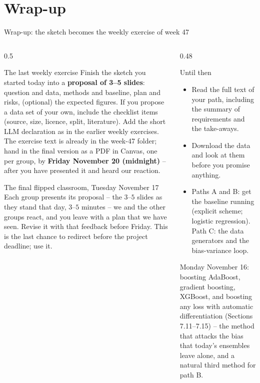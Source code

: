 \documentclass[10pt,aspectratio=169]{beamer}
\begin{document}
\section{Wrap-up}

\begin{frame}{Wrap-up: the sketch becomes the weekly exercise of week 47}
\scriptsize
\begin{columns}[T]
\begin{column}{0.5\textwidth}
\begin{block}{The last weekly exercise}
Finish the sketch you started today into a \textbf{proposal of 3--5
slides}: question and data, methods and baseline, plan and risks, (optional)
the expected figures.  If you propose a data set of your own, include the
checklist items (source, size, licence, split, literature).  Add the short
LLM declaration as in the earlier weekly exercises.  The exercise text is
already in the week-47 folder; hand in the final version as a PDF in
Canvas, one per group, by \textbf{Friday November 20 (midnight)} -- after
you have presented it and heard our reaction.
\end{block}
\begin{block}{The final flipped classroom, Tuesday November 17}
Each group presents its proposal -- the $3$--$5$ slides as they stand that
day, $3$--$5$ minutes -- we and the other groups react, and you leave with a
plan that we have seen.  Revise it with that feedback before Friday.  This
is the last chance to redirect before the project deadline; use it.
\end{block}
\end{column}
\begin{column}{0.48\textwidth}
\begin{block}{Until then}
\begin{itemize}
  \item Read the full text of your path, including the summary of
        requirements and the take-aways.
  \item Download the data and look at them before you promise anything.
  \item Paths A and B: get the baseline running (explicit scheme; logistic
        regression).  Path C: the data generators and the bias-variance loop.
\end{itemize}
\end{block}
\begin{block}{Monday November 16: boosting}
AdaBoost, gradient boosting, XGBoost, and boosting any loss with automatic
differentiation (Sections 7.11--7.15) -- the method that attacks the bias
that today's ensembles leave alone, and a natural third method for path B.
\end{block}
\end{column}
\end{columns}
\end{frame}
\end{document}
